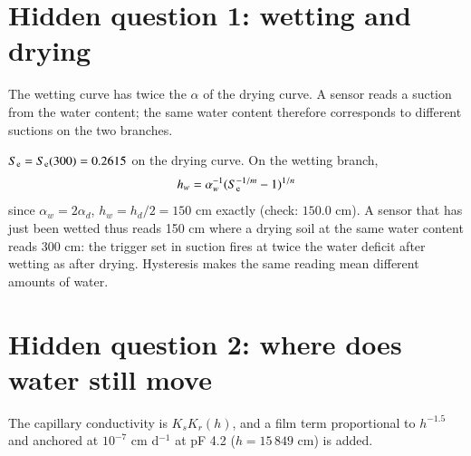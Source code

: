 \section{Hidden question 1: wetting and drying}
The wetting curve has twice the $\alpha$ of the drying curve. A sensor reads a suction from the water content; the same water content therefore corresponds to different suctions on the two branches.

\sol {}\ans $S_{\mathrm e}=S_{\mathrm e}(300)=0.2615$ on the drying curve. On the wetting branch, \[h_w=\alpha_w^{-1}(S_{\mathrm e}^{-1/m}-1)^{1/n}\]
since $\alpha_w=2\alpha_d$, $h_w=h_d/2=150$ cm exactly (check: $150.0$ cm). A sensor that has just been wetted thus reads 150 cm where a drying soil at the same water content reads 300 cm: the trigger set in suction fires at twice the water deficit after wetting as after drying. Hysteresis makes the same reading mean different amounts of water. \finans


\section{Hidden question 2: where does water still move}
The capillary conductivity is $K_s K_r(h)$, and a film term proportional to $h^{-1.5}$ and anchored at $10^{-7}$ cm d$^{-1}$ at pF 4.2 ($h=15\,849$ cm) is added.

